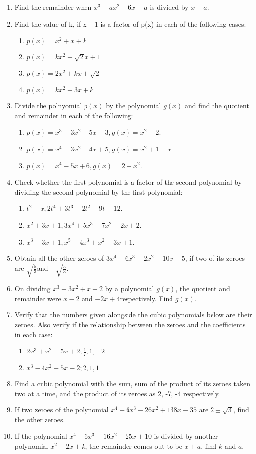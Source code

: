 \renewcommand{\theequation}{\theenumi}
\begin{enumerate}[label=\arabic*.,ref=\thesubsection.\theenumi]
\item Find the remainder when $x^3-ax^2 +6x-a$ is divided by $x-a$.
\item Find the value of k, if x – 1 is a factor of p(x) in each of the following cases: 
\begin{enumerate}
\item $p(x) = x^2 + x + k$
\item $p(x) = kx^2-\sqrt{2}x+1$
\item $p(x) = 2x^2 + kx + \sqrt{2}$
\item $p(x) = kx^2  - 3x + k$
\end{enumerate}
\item Divide the polnyomial $p(x)$ by the polynomial $g(x)$ and find the quotient and remainder in each of the following:
\begin{enumerate}
\item $p(x) = x^3-3x^2+5x-3, g(x) = x^2-2$.
\item $p(x) = x^4-3x^2+4x+5, g(x) = x^2+1-x$.
\item $p(x) = x^4-5x+6, g(x) = 2-x^2$.
\end{enumerate}
\item Check whether the first polynomial is a factor of the second polynomial by dividing the second polynomial by the first polynomial:
\begin{enumerate}
\item $t^2-x,2t^4+3t^3-2t^2-9t-12$.
\item $x^2+3x+1, 3x^4+5x^3-7x^2+2x+2$.
\item $x^3-3x+1, x^5-4x^3+x^2+3x+1$.
\end{enumerate}
%
\item Obtain all the other zeroes of $3x^4+6x^3-2x^2-10x-5$, if two of its zeroes are $\sqrt{\frac{5}{3}}$and $-\sqrt{\frac{5}{3}}$.
\item On dividing $x^3-3x^2+x+2$ by a polynomial $g(x)$, the quotient and remainder were $x-2$ and $-2x+4$respectively.  Find $g(x)$.
\item Verify that the numbers given alongside the cubic polynomials below are their zeroes.  Also verify if the relationship between the zeroes and the coefficients in each case:
\begin{enumerate}
\item $2x^3+x^2-5x+2; \frac{1}{2}, 1, -2$
\item $x^3-4x^2+5x-2; 2, 1, 1$
\end{enumerate}
\item Find a cubic polynomial with the sum, sum of the product of its zeroes taken two at a time, and the product of its zeroes as 2, -7, -4 respectively.
\item If two zeroes of the polynomial $x^4-6x^3-26x^2+138x-35$ are $2\pm \sqrt{3}$, find the other zeroes.\item If the polynomial $x^4-6x^3+16x^2-25x+10$ is divided by another polynomial $x^2-2x+k$, the remainder comes out to be $x+a$, find $k$ and $a$.
\end{enumerate}
